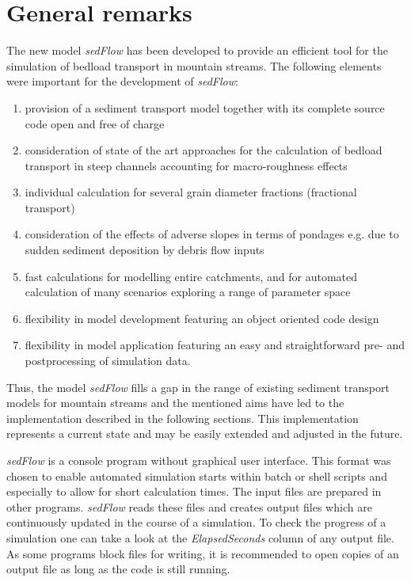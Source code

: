 \documentclass[11pt,a4paper]{article}
\begin{document}
\section{General remarks}\label{GeneralRemarks}
The \label{QuickStartGuideBegin} new model \emph{sedFlow} has been developed to provide an efficient tool for the simulation of bedload transport in mountain streams. The following elements were important for the development of \emph{sedFlow}:
{
\renewcommand{\theenumi}{\roman{enumi}}
\renewcommand{\labelenumi}{(\theenumi)}
\begin{enumerate}
  \item provision of a sediment transport model together with its complete source code open and free of charge
  \item consideration of state of the art approaches for the calculation of bedload transport in steep channels accounting for macro-roughness effects
  \item individual calculation for several grain diameter fractions (fractional transport)
  \item consideration of the effects of adverse slopes in terms of pondages e.g. due to sudden sediment deposition by debris flow inputs
  \item fast calculations for modelling entire catchments, and for automated calculation of many scenarios exploring a range of parameter space
  \item flexibility in model development featuring an object oriented code design
  \item flexibility in model application featuring an easy and straightforward pre- and postprocessing of simulation data.
\end{enumerate}
}
Thus, the model \emph{sedFlow} fills a gap in the range of existing sediment transport models for mountain streams and the mentioned aims have led to the implementation described in the following sections. This implementation represents a current state and may be easily extended and adjusted in the future.

\emph{sedFlow} is a console program without graphical user interface. This format was chosen to enable automated simulation starts within batch or shell scripts and especially to allow for short calculation times. The input files are prepared in other programs. \emph{sedFlow} reads these files and creates output files which are continuously updated in the course of a simulation. To check the progress of a simulation one can take a look at the \emph{ElapsedSeconds} column of any output file. As some programs block files for writing, it is recommended to open copies of an output file as long as the code is still running.
\end{document}
